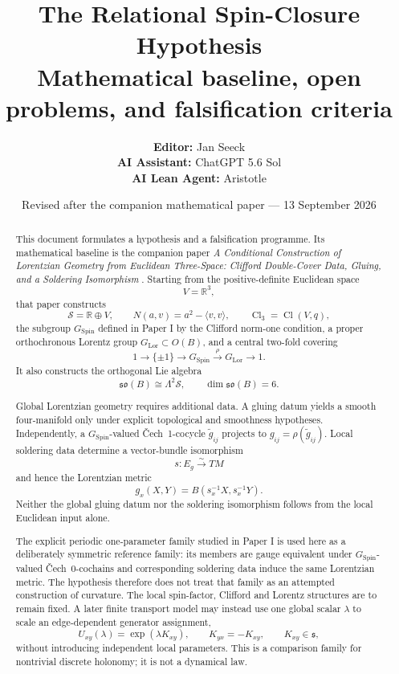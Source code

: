 \documentclass[11pt,a4paper]{article}
\title{\textbf{The Relational Spin-Closure Hypothesis}\\[0.35em]
\large Mathematical baseline, open problems, and falsification criteria}
\author{\textbf{Editor:} Jan Seeck\\
\textbf{AI Assistant:} ChatGPT 5.6 Sol\\
\textbf{AI Lean Agent:} Aristotle}
\date{Revised after the companion mathematical paper --- 13 September 2026}
\theoremstyle{remark}
\newcommand{\R}{\mathbb{R}}
\newcommand{\Cl}{\operatorname{Cl}}
\newcommand{\SpinG}{G_{\mathrm{Spin}}}
\newcommand{\LorG}{G_{\mathrm{Lor}}}
\newcommand{\Smodel}{\mathcal S}
\newcommand{\soB}{\mathfrak{so}(B)}
\newcommand{\Cech}{\ifmmode\text{\v{C}ech}\else\v{C}ech\fi}
\begin{document}
\maketitle

\begin{abstract}
This document formulates a hypothesis and a falsification programme.  Its mathematical baseline is the companion paper \emph{A Conditional Construction of Lorentzian Geometry from Euclidean Three-Space: Clifford Double-Cover Data, Gluing, and a Soldering Isomorphism} \cite{PaperI}.  Starting from the positive-definite Euclidean space
\[
  V=\R^3,
\]
that paper constructs
\[
  \Smodel=\R\oplus V,
  \qquad
  N(a,v)=a^2-\langle v,v\rangle,
  \qquad
  \Cl_3=\Cl(V,q),
\]
the subgroup \(\SpinG\) defined in Paper I by the Clifford norm-one condition, a proper orthochronous Lorentz group \(\LorG\subset O(B)\), and a central two-fold covering
\[
  1\longrightarrow\{\pm1\}
  \longrightarrow\SpinG
  \overset{\rho}{\longrightarrow}\LorG
  \longrightarrow1.
\]
It also constructs the orthogonal Lie algebra
\[
  \soB\cong\Lambda^2\Smodel,
  \qquad \dim\soB=6.
\]

Global Lorentzian geometry requires additional data.  A gluing datum yields a smooth four-manifold only under explicit topological and smoothness hypotheses.  Independently, a \(\SpinG\)-valued \Cech\ 1-cocycle \(\widetilde g_{ij}\) projects to \(g_{ij}=\rho(\widetilde g_{ij})\).  Local soldering data determine a vector-bundle isomorphism
\[
  s:E_g\xrightarrow{\sim}TM
\]
and hence the Lorentzian metric
\[
  g_x(X,Y)=B\!\left(s_x^{-1}X,s_x^{-1}Y\right).
\]
Neither the global gluing datum nor the soldering isomorphism follows from the local Euclidean input alone.

The explicit periodic one-parameter family studied in Paper I is used here as a deliberately symmetric reference family: its members are gauge equivalent under \(\SpinG\)-valued \Cech\ 0-cochains and corresponding soldering data induce the same Lorentzian metric.  The hypothesis therefore does not treat that family as an attempted construction of curvature.  The local spin-factor, Clifford and Lorentz structures are to remain fixed.  A later finite transport model may instead use one global scalar \(\lambda\) to scale an edge-dependent generator assignment,
\[
  U_{xy}(\lambda)=\exp(\lambda K_{xy}),
  \qquad K_{yx}=-K_{xy},
  \qquad K_{xy}\in\mathfrak s,
\]
without introducing independent local parameters.  This is a comparison family for nontrivial discrete holonomy; it is not a dynamical law.


\end{abstract}
\end{document}
